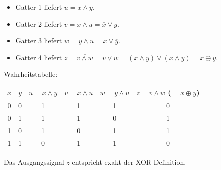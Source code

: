 \begin{mychallenge}
\begin{myanswer}
\begin{enumerate}[(a)]
            \begin{itemize}
                \item Gatter 1 liefert $u = \overline{x \wedge y}$.
                \item Gatter 2 liefert $v = \overline{x \wedge u} = \overline{x} \vee y$.
                \item Gatter 3 liefert $w = \overline{y \wedge u} = x \vee \overline{y}$.
                \item Gatter 4 liefert $z = \overline{v \wedge w} = \overline{v} \vee \overline{w} = (x \wedge \overline{y}) \vee (\overline{x} \wedge y) = x \oplus y$.
            \end{itemize}
            Wahrheitstabelle:
            \begin{center}
                \begin{tabular}{cccccc}
                    $x$ & $y$ & $u = \overline{x \wedge y}$ & $v = \overline{x \wedge u}$ & $w = \overline{y \wedge u}$ & $z = \overline{v \wedge w}$ ($= x \oplus y$) \\\midrule\midrule
                    0 & 0 & 1 & 1 & 1 & 0 \\\midrule
                    0 & 1 & 1 & 1 & 0 & 1 \\\midrule
                    1 & 0 & 1 & 0 & 1 & 1 \\\midrule
                    1 & 1 & 0 & 1 & 1 & 0 \\
                \end{tabular}
            \end{center}
            Das Ausgangssignal $z$ entspricht exakt der XOR-Definition.
        \end{enumerate}
    \end{myanswer}
\end{mychallenge}

